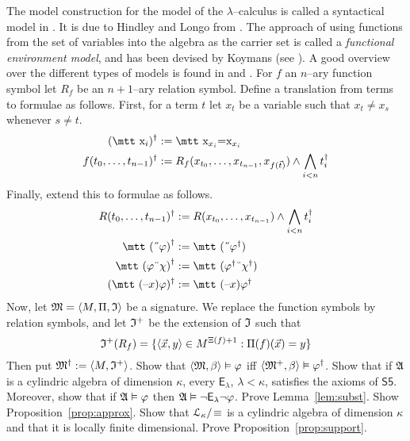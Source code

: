 The model construction for the model of the $\lambda$--calculus is
called a syntactical model in \cite{barendregt:lambda}. It is due 
to Hindley and Longo from \cite{hindleylongo:models}. 
The approach of using functions from the set of variables into the algebra 
as the carrier set is called a {\it functional environment model}, 
and has been devised by Koymans (see \cite{koymans:lambda}). 
A good overview over the different types of models is found in 
\cite{meyer:model} and \cite{koymans:lambda}.
\vplatz
\exercise
For $f$ an $n$--ary function symbol let $R_f$ be an $n+1$--ary
relation symbol. Define a translation from terms to formulae as
follows. First, for a term $t$ let $x_t$ be a variable such
that $x_t \neq x_s$ whenever $s \neq t$.
\begin{subequations}
\begin{align}
(\mbox{\mtt x$_i$})^{\dagger} & := \mbox{\mtt x$_{x_i}$\symbol{61}x$_{x_i}$} \\
f(t_0,\dotsc, t_{n-1})^{\dagger} & :=
    R_f(x_{t_0}, \dotsc, x_{t_{n-1}},
    x_{f(\vec{t})}) \und \gund_{i < n} t_i^{\dagger}
\end{align}
\end{subequations}
Finally, extend this to formulae as follows.
\begin{subequations}
\begin{align}
R(t_0, \dotsc, t_{n-1})^{\dagger} & := R(x_{t_0}, \dotsc, x_{t_{n-1}})
    \und\gund_{i < n} t_i^{\dagger} \\
\mbox{\mtt (\symbol{5}$\varphi$)}^{\dagger} & :=
    \mbox{\mtt (\symbol{5}$\varphi^{\dagger}$)} \\
\mbox{\mtt ($\varphi$\symbol{4}$\chi$)}^{\dagger} & :=
    \mbox{\mtt ($\varphi^{\dagger}$\symbol{4}$\chi^{\dagger}$)} \\
(\mbox{\mtt (\symbol{21}$x$)$\varphi$})^{\dagger} & :=
    \mbox{\mtt (\symbol{21}$x$)$\varphi^{\dagger}$}
\end{align}
\end{subequations}
Now, let $\mathfrak{M} = \langle M, \Pi, \mathfrak{I}\rangle$ be a signature. We replace
the function symbols by relation symbols, and let $\mathfrak{I}^+$ be the
extension of $\mathfrak{I}$ such that
\begin{equation}
\mathfrak{I}^+(R_f) = \{\langle \vec{x},y\rangle \in M^{\Xi(f)+1} :
\Pi(f)(\vec{x}) = y\}
\end{equation}
Then put $\mathfrak{M}^{\dagger} := \langle M, \mathfrak{I}^+\rangle$.
Show that $\langle \mathfrak{M}, \beta\rangle \vDash \varphi$
iff $\langle \mathfrak{M}^+, \beta\rangle \vDash \varphi^{\dagger}$.
\vplatz 
\exercise 
Show that if $\mathfrak{A}$ is a cylindric algebra of
dimension $\kappa$, every $\mathsf{E}_{\lambda}$, $\lambda <
\kappa$, satisfies the axioms of $\mathsf{S5}$. Moreover, show that if
$\mathfrak{A} \vDash \varphi$ then $\mathfrak{A} \vDash \neg\mathsf{E}_{\lambda}
\neg\varphi$.
\vplatz
\exercise
Prove Lemma~\ref{lem:subst}.
\vplatz
\exercise
Show Proposition~\ref{prop:approx}.
\vplatz
\exercise
Show that $\mathcal{L}_{\kappa}/\!\equiv$ is a cylindric algebra of
dimension $\kappa$ and that it is locally finite dimensional.
\vplatz
\exercise
Prove Proposition~\ref{prop:support}.
